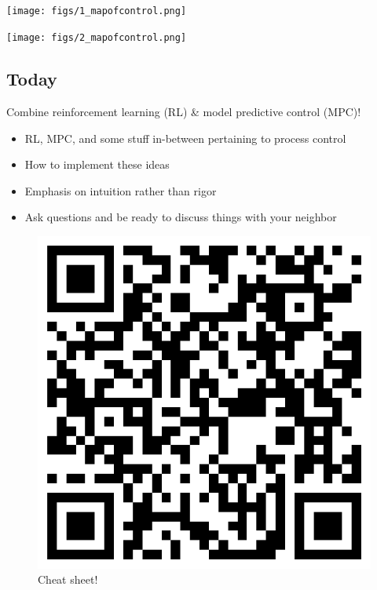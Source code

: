 \documentclass[
  letterpaper,
  DIV=11,
  numbers=noendperiod,
  oneside]{scrartcl}
\providecommand{\tightlist}{%
  \setlength{\itemsep}{0pt}\setlength{\parskip}{0pt}}\usepackage{longtable,booktabs,array}
\begin{document}
\subsection{}\label{section-2}

\begin{center}
\texttt{[image: figs/1\_mapofcontrol.png]}
\end{center}

\begin{center}
\texttt{[image: figs/2\_mapofcontrol.png]}
\end{center}

\subsection{Today}\label{today}

Combine reinforcement learning (RL) \& model predictive control (MPC)!

\begin{itemize}
\tightlist
\item
  RL, MPC, and some stuff in-between pertaining to process control
\item
  How to implement these ideas
\item
  Emphasis on intuition rather than rigor
\item
  Ask questions and be ready to discuss things with your neighbor
\end{itemize}

\begin{figure}[H]

{\centering \includegraphics{figs/qr-cheatsheet.png}

}

\caption{Cheat sheet!}

\end{figure}%
\end{document}
